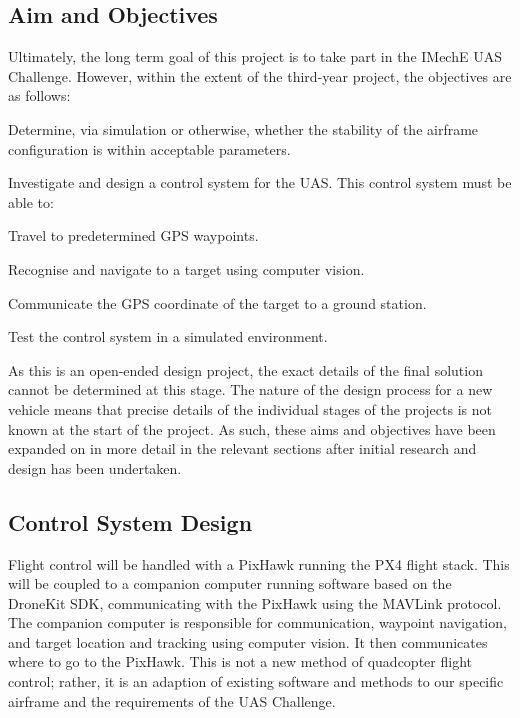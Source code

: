 \documentclass[11pt]{article}
\begin{document}
\subsection{Aim and Objectives}
Ultimately, the long term goal of this project is to take part in the IMechE UAS Challenge. However, within the extent of the third-year project, the objectives are as follows:

\begin{compactenum}
    \item Determine, via simulation or otherwise, whether the stability of the airframe configuration is within acceptable parameters.
    \item Investigate and design a control system for the UAS. This control system must be able to:
    \begin{compactenum}
        \item Travel to predetermined GPS waypoints.
        \item Recognise and navigate to a target using computer vision.
        \item Communicate the GPS coordinate of the target to a ground station.
    \end{compactenum}
    \item Test the control system in a simulated environment.
\end{compactenum}


As this is an open-ended design project, the exact details of the final solution cannot be determined at this stage. The nature of the design process for a new vehicle means that precise details of the individual stages of the projects is not known at the start of the project.
As such, these aims and objectives have been expanded on in more detail in the relevant sections after initial research and design has been undertaken.

\subsection{Control System Design}
Flight control will be handled with a PixHawk running the PX4 flight stack. This will be coupled to a companion computer running software based on the DroneKit SDK, communicating with the PixHawk using the MAVLink protocol. The companion computer is responsible for communication, waypoint navigation, and target location and tracking using computer vision. It then communicates where to go to the PixHawk. This is not a new method of quadcopter flight control; rather, it is an adaption of existing software and methods to our specific airframe and the requirements of the UAS Challenge.
\end{document}
